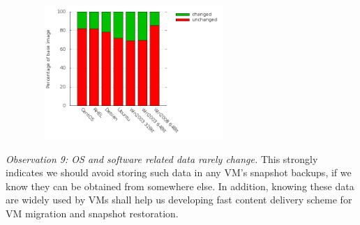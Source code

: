 \begin{figure}
  \centering
  \includegraphics[width=3in,height=2in]{os_subset.png}
  \caption{}
  \label{fig:osdup}
\end{figure}

\emph{Observation 9: OS and software related data rarely change.}
This strongly indicates we should avoid storing such data in any VM's snapshot backups,
if we know they can be obtained from somewhere else. 
In addition, knowing these data are widely used by VMs shall help us developing
fast content delivery scheme for VM migration and snapshot restoration.
